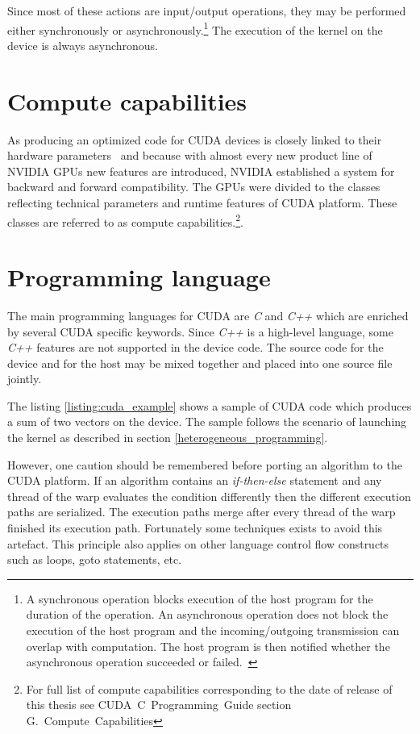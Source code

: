 \documentclass[12pt,oneside]{fithesis2}
\begin{document}
\noindent
Since most of these actions are input/output operations, they may be performed either synchronously or asynchronously.\footnote{A synchronous operation blocks execution of the host program for the duration of the operation. An asynchronous operation does not block the execution of the host program and the incoming/outgoing transmission can overlap with computation. The host program is then notified whether the asynchronous operation succeeded or failed.~\cite{async_io}} The execution of the kernel on the device is always asynchronous.~\cite{cuda_guide}

\section{Compute capabilities}

As producing an optimized code for CUDA devices is closely linked to their hardware parameters~\cite{cuda_best_practices} and because with almost every new product line of NVIDIA GPUs new features are introduced, NVIDIA established a system for backward and forward compatibility. The GPUs were divided to the classes reflecting technical parameters and runtime features of CUDA platform. These classes are referred to as compute capabilities.\footnote{For full list of compute capabilities corresponding to the date of release of this thesis see CUDA~C~Programming~Guide \cite{cuda_guide} section G.~Compute~Capabilities}.

\section{Programming language}
\label{cuda_lang}

The main programming languages for CUDA are \emph{C} and \emph{C++} which are enriched by several CUDA specific keywords. Since \emph{C++} is a high-level language, some \emph{C++} features are not supported in the device code. The source code for the device and for the host may be mixed together and placed into one source file jointly.~\cite{cuda_guide}

The listing \ref{listing:cuda_example} shows a sample of CUDA code which produces a sum of two vectors on the device. The sample follows the scenario of launching the kernel as described in section \ref{heterogeneous_programming}.

However, one caution should be remembered before porting an algorithm to the CUDA platform. If an algorithm contains an \emph{if-then-else} statement and any thread of the warp evaluates the condition differently then the different execution paths are serialized. The execution paths merge after every thread of the warp finished its execution path. Fortunately some techniques exists to avoid this artefact. This principle also applies on other language control flow constructs such as loops, goto statements, etc.~\cite{cuda_guide}
\end{document}
